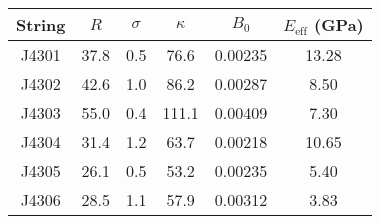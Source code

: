 \begin{tabular}{cccccc}
\toprule
String & $R$ & $\sigma$ & $\kappa$ & $B_0$ & $E_\mathrm{eff}$ (GPa) \\
\midrule
J4301 & 37.8 & 0.5 & 76.6 & 0.00235 & 13.28 \\
J4302 & 42.6 & 1.0 & 86.2 & 0.00287 & 8.50 \\
J4303 & 55.0 & 0.4 & 111.1 & 0.00409 & 7.30 \\
J4304 & 31.4 & 1.2 & 63.7 & 0.00218 & 10.65 \\
J4305 & 26.1 & 0.5 & 53.2 & 0.00235 & 5.40 \\
J4306 & 28.5 & 1.1 & 57.9 & 0.00312 & 3.83 \\
\bottomrule
\end{tabular}
